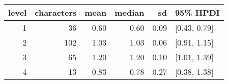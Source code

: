 
\begin{tabular}[t]{rrrrrl}
\toprule
level & characters & mean & median & sd & 95\% HPDI\\
\midrule
1 & 36 & 0.60 & 0.60 & 0.09 & {}[0.43, 0.79]\\
2 & 102 & 1.03 & 1.03 & 0.06 & {}[0.91, 1.15]\\
3 & 65 & 1.20 & 1.20 & 0.10 & {}[1.01, 1.39]\\
4 & 13 & 0.83 & 0.78 & 0.27 & {}[0.38, 1.38]\\
\bottomrule
\end{tabular}
